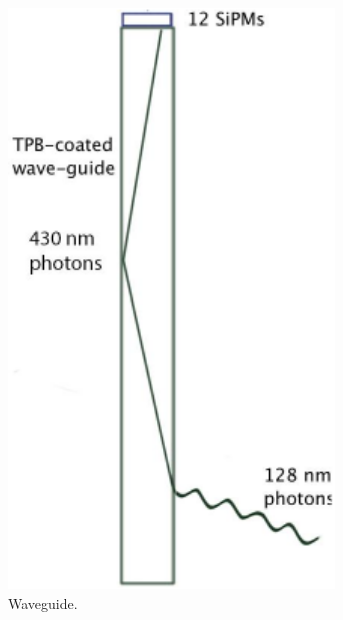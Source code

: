 \begin{figure}

	\centering

	\begin{subfigure}[b]{0.29\textwidth}
		\centering
		\includegraphics[width=0.95\textwidth]{figures/pdsp_pd.pdf}
		\caption{Waveguide.}
		\label{fig:pd_bars}
	\end{subfigure}
	\begin{subfigure}[b]{0.69\textwidth}
		\centering

\end{subfigure}
\end{figure}
